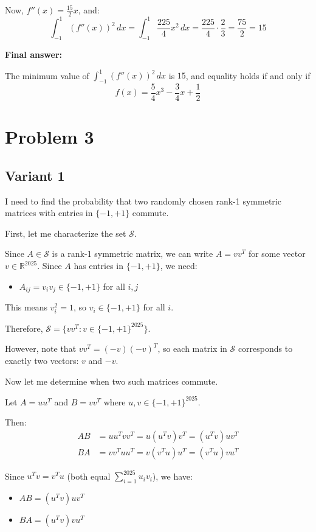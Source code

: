 \documentclass[12pt,a4paper]{article}
\theoremstyle{definition}
\begin{document}
        Now, $f''(x) = \frac{15}{2}x$, and:
        $$\int_{-1}^{1} (f''(x))^2 \, dx = \int_{-1}^{1} \frac{225}{4}x^2 \, dx = \frac{225}{4} \cdot \frac{2}{3} = \frac{75}{2} = 15$$

        \textbf{Final answer:}

        The minimum value of $\int_{-1}^{1} (f''(x))^2 \, dx$ is $15$, and equality holds if and only if
        $$f(x) = \frac{5}{4}x^3 - \frac{3}{4}x + \frac{1}{2}$$

\section{Problem 3}
\subsection{Variant 1}
    I need to find the probability that two randomly chosen rank-1 symmetric matrices with entries in $\{-1, +1\}$ commute.

    First, let me characterize the set $\mathcal{S}$.

    Since $A \in \mathcal{S}$ is a rank-1 symmetric matrix, we can write $A = vv^T$ for some vector $v \in \mathbb{R}^{2025}$. Since $A$ has entries in $\{-1, +1\}$, we need:
    \begin{itemize}
        \item $A_{ij} = v_i v_j \in \{-1, +1\}$ for all $i, j$
    \end{itemize}

    This means $v_i^2 = 1$, so $v_i \in \{-1, +1\}$ for all $i$.

    Therefore, $\mathcal{S} = \{vv^T : v \in \{-1, +1\}^{2025}\}$.

    However, note that $vv^T = (-v)(-v)^T$, so each matrix in $\mathcal{S}$ corresponds to exactly two vectors: $v$ and $-v$.

    Now let me determine when two such matrices commute.

    Let $A = uu^T$ and $B = vv^T$ where $u, v \in \{-1, +1\}^{2025}$.

    Then:
    \begin{align}
        AB &= uu^T vv^T = u(u^T v)v^T = (u^T v) uv^T \\
        BA &= vv^T uu^T = v(v^T u)u^T = (v^T u) vu^T
    \end{align}

    Since $u^T v = v^T u$ (both equal $\sum_{i=1}^{2025} u_i v_i$), we have:
    \begin{itemize}
        \item $AB = (u^T v) uv^T$
        \item $BA = (u^T v) vu^T$
    \end{itemize}
\end{document}
